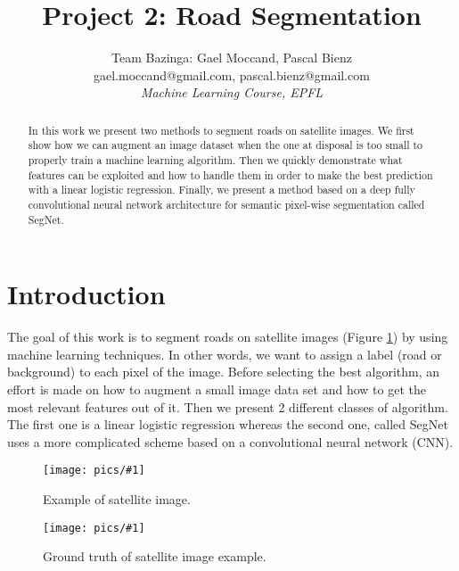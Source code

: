 \documentclass[10pt,conference,compsocconf]{IEEEtran}
\newcommand{\scalefig}[4]{
  \begin{figure}[ht!]
    \centering
    \texttt{[image: pics/\#1]}
 \caption{#3}
    \label{#4}
  \end{figure}}
\begin{document}
\title{Project 2: Road Segmentation}

\author{
  Team Bazinga:
  Gael Moccand, Pascal Bienz\\
  gael.moccand@gmail.com, pascal.bienz@gmail.com\\
  \textit{Machine Learning Course, EPFL}
}

\maketitle

\begin{abstract}
In this work we present two methods to segment roads on satellite images. We first show how we can augment an image dataset when the one at disposal is too small to properly train a machine learning algorithm. Then we quickly demonstrate what features can be exploited and how to handle them in order to make the best prediction with a linear logistic regression. Finally, we present a method based on a deep fully convolutional neural network architecture for semantic pixel-wise segmentation called SegNet.
\end{abstract}

\section{Introduction}
The goal of this work is to segment roads on satellite images (Figure \ref{fig:satImage}) by using machine learning techniques. In other words, we want to assign a label (road or background) to each pixel of the image. Before selecting the best algorithm, an effort is made on how to augment a small image data set and how to get the most relevant features out of it. Then we present 2 different classes of algorithm. The first one is a linear logistic regression whereas the second one, called SegNet~\cite{segnet} uses a more complicated scheme based on a convolutional neural network (CNN).\\

\scalefig{satImage}{0.8}{Example of satellite image.}{fig:satImage}
\scalefig{satImage_gt}{0.8}{Ground truth of satellite image example.}{fig:satImage_gt}
\end{document}
